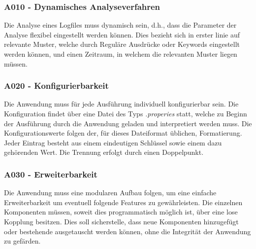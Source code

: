 \subsubsection{A010 - Dynamisches Analyseverfahren}\label{subsubsec:A010}
Die Analyse eines Logfiles muss dynamisch sein, d.h., dass die Parameter der Analyse flexibel eingestellt werden können. Dies bezieht sich in erster linie auf relevante Muster, welche durch Reguläre Ausdrücke oder Keywords eingestellt werden können, und einen Zeitraum, in welchem die relevanten Muster liegen müssen.

\subsubsection{A020 - Konfigurierbarkeit}\label{subsubsec:A020}
Die Anwendung muss für jede  Ausführung individuell konfigurierbar sein. Die Konfiguration findet über eine Datei des Typs \textit{.properies} statt, welche zu Beginn der Ausführung durch die Anwendung geladen und interpretiert werden muss. Die Konfigurationswerte folgen der, für dieses Dateiformat üblichen, Formatierung. Jeder Eintrag besteht aus einem eindeutigen Schlüssel sowie einem dazu gehörenden Wert. Die Trennung erfolgt durch einen Doppelpunkt.

\subsubsection{A030 - Erweiterbarkeit}\label{subsubsec:A030}
Die Anwendung muss eine modularen Aufbau folgen, um eine einfache Erweiterbarkeit um eventuell folgende Features zu gewährleisten. Die einzelnen Komponenten müssen, soweit dies programmatisch möglich ist, über eine lose Kopplung besitzen. Dies soll sicherstelle, dass neue Komponenten hinzugefügt oder bestehende ausgetauscht werden können, ohne die Integrität der Anwendung zu gefärden.


